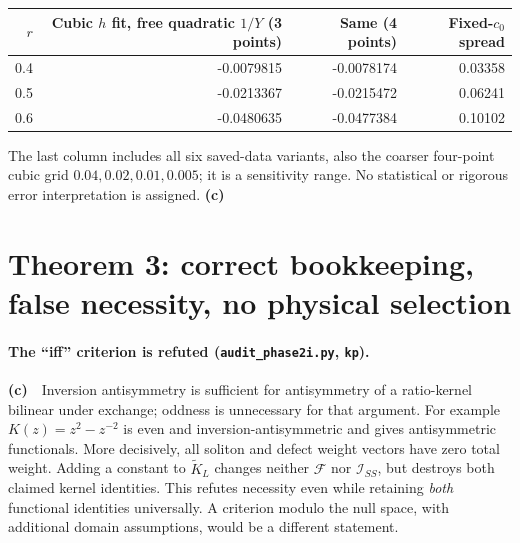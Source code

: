 \documentclass[11pt,a4paper]{article}
\newcommand{\Lc}{\textbf{(c)}\ }
\newcommand{\scr}{\texttt{audit\_\allowbreak phase2i.py}}
\begin{document}
\begin{center}\small
\begin{tabular}{rrrr}\toprule
$r$ & Cubic $h$ fit, free quadratic $1/Y$ (3 points) & Same (4 points) & Fixed-$c_0$ spread\\\midrule
0.4 & -0.0079815 & -0.0078174 & 0.03358\\
0.5 & -0.0213367 & -0.0215472 & 0.06241\\
0.6 & -0.0480635 & -0.0477384 & 0.10102\\
\bottomrule\end{tabular}\end{center}
The last column includes all six saved-data variants, also the coarser
four-point cubic grid $0.04,0.02,0.01,0.005$; it is a sensitivity range.
No statistical or rigorous error interpretation is assigned. \Lc


\section{Theorem 3: correct bookkeeping, false necessity, no physical selection}
\paragraph{The ``iff'' criterion is refuted (\scr, \texttt{kp}).}
\Lc\ Inversion antisymmetry is sufficient for antisymmetry of a ratio-kernel
bilinear under exchange; oddness is unnecessary for that argument.
For example $K(z)=z^2-z^{-2}$ is even and inversion-antisymmetric and gives
antisymmetric functionals. More decisively, all soliton and defect weight
vectors have zero total weight. Adding a constant to $\widetilde K_L$
changes neither $\mathcal F$ nor $\mathcal I_{SS}$, but destroys both
claimed kernel identities. This refutes necessity even while retaining
\emph{both} functional identities universally. A criterion modulo the null
space, with additional domain assumptions, would be a different statement.
\end{document}
